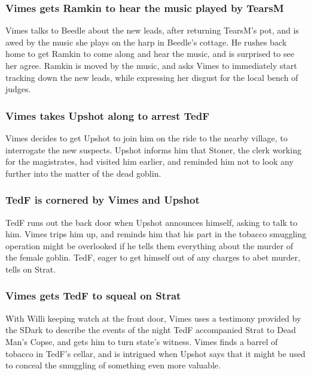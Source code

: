 \subsubsection{\Gls{Vimes} gets \Gls{Ramkin} to hear the music played by \Gls{TearsM}}
\Gls{Vimes} talks to \Gls{Beedle} about the new leads, after returning \Gls{TearsM}'s pot, and
is awed by the music she plays on the harp in \Gls{Beedle}'s cottage. He rushes back home to get
\Gls{Ramkin} to come along and hear the music, and is surprised to see her agree. \Gls{Ramkin} is
moved by the music, and asks \Gls{Vimes} to immediately start tracking down the new leads, while
expressing her disgust for the local bench of judges.

\subsubsection{\Gls{Vimes} takes \Gls{Upshot} along to arrest \Gls{TedF}}
\Gls{Vimes} decides to get \Gls{Upshot} to join him on the ride to the nearby village, to
interrogate the new suspects. \Gls{Upshot} informs him that \Gls{Stoner}, the clerk working for the
magistrates, had visited him earlier, and reminded him not to look any further into the matter of
the dead goblin.

\subsubsection{\Gls{TedF} is cornered by \Gls{Vimes} and \Gls{Upshot}}
\Gls{TedF} runs out the back door when \Gls{Upshot} announces himself, asking to talk to him.
\Gls{Vimes} trips him up, and reminds him that his part in the tobacco smuggling operation might be
overlooked if he tells them everything about the murder of the female goblin. \Gls{TedF}, eager to
get himself out of any charges to abet murder, tells on \Gls{Strat}.

\subsubsection{\Gls{Vimes} gets \Gls{TedF} to squeal on \Gls{Strat}}
With \Gls{Willi} keeping watch at the front door, \Gls{Vimes} uses a testimony provided by the
\Gls{SDark} to describe the events of the night \Gls{TedF} accompanied \Gls{Strat} to Dead Man's
Copse, and gets him to turn state's witness. \Gls{Vimes} finds a barrel of tobacco in \Gls{TedF}'s
cellar, and is intrigued when \Gls{Upshot} says that it might be used to conceal the smuggling of
something even more valuable.

